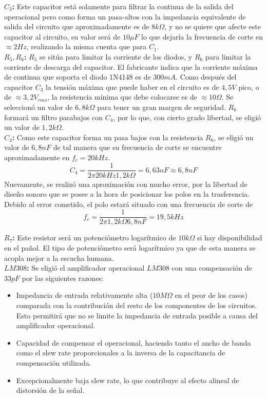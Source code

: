 \textbf{$C_3$:} Este capacitor está solamente para filtrar la continua de la salida del operacional pero como forma un pasa-altos con la impedancia equivalente de salida del circuito que aproximadamente es de $8k\Omega$, y no se quiere que afecte este capacitor al circuito, su valor será de $10\mu F$ lo que dejaría la frecuencia de corte en $\approx 2Hz$, realizando la misma cuenta que para $C_1$.\\

\textbf{$R_5, R_6$:} $R_5$ se sitúa para limitar la corriente de los diodos, y $R_6$ para limitar la corriente de descarga del capacitor. El fabricante indica que la corriente máxima de continua que soporta el diodo 1N4148 es de $300mA$. Como después del capacitor $C_3$ la tensión máxima que puede haber en el circuito es de $4,5V$ pico, o de $\approx 3,2V_{rms}$, la resistencia mínima que debe colocarse es de $\approx 10\Omega$. Se seleccionó un valor de $6,8k\Omega$ para tener un gran margen de seguridad. $R_6$ formará un filtro pasabajos con $C_4$, por lo que, con cierto grado libertad, se eligió un valor de $1,2k\Omega$.\\

\textbf{$C_4$:} Como este capacitor forma un pasa bajos con la resistencia $R_6$, se eligió un valor de $6,8nF$ de tal manera que su frecuencia de corte se encuentre aproximadamente en $f_c = 20kHz$.
\[ C_4 = \frac{1}{2\pi 20kHz 1,2k\Omega} = 6,63nF \approx 6,8nF\]
Nuevamente, se realizó una aproximación con mucho error, por la libertad de diseño sonoro que se posee a la hora de posicionar los polos en la trasferencia. Debido al error cometido, el polo estará situado con una frecuencia de corte de $$ f_c = \frac{1}{2\pi 1,2k\Omega 6,8nF} = 19,5kHz $$

\textbf{$R_7$:} Este resistor será un potenciómetro logarítmico de $10k\Omega$ si hay disponibilidad en el pañol. El tipo de potenciómetro será logarítmico ya que de esta manera se acopla mejor a la escucha humana.\\

\textbf{$LM308$:} Se eligió el amplificador operacional $LM308$ con una compensación de $33pF$ por las siguientes razones:

\begin{itemize}
\item Impedancia de entrada relativamente alta ($10M\Omega$ en el peor de los casos) comparada con la contribución del resto de los componentes de los circuitos. Esto permitirá que no se limite la impedancia de entrada posible a causa del amplificador operacional.
\item Capacidad de compensar el operacional, haciendo tanto el ancho de banda como el slew rate proporcionales a la inversa de la capacitancia de compensación utilizada.
\item Excepcionalmente baja slew rate, lo que contribuye al efecto alineal de distorsión de la señal.
\end{itemize}

